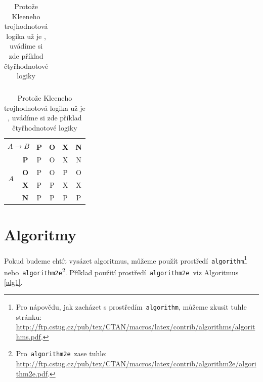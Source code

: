 \documentclass[11pt]{article}
\begin{document}
\begin{table}[h]
\begin{tabular}{|c|>{\bfseries}c|c|c|c|c|}
                    \hline 
                \end{tabular}
                \begin{tabular}{|c|>{\bfseries}c|c|c|c|c|}
                    \hline 
                    \multicolumn{2}{|c|}{\multirow{2}{*}{$A \rightarrow B$}}&\multicolumn{4}{|c|}{$B$}\\\cline{3-6}
                    \multicolumn{2}{|c|}{} & \textbf{P} & \textbf{O} & \textbf{X} & \textbf{N} \\ 
                    \hline 
                    \multirow{4}{*}{$A$}
                    & \textbf{P}  &  P & O & X & N  \\\cline{2-6} 
                    & \textbf{O}  &  P & O & P & O  \\\cline{2-6}
                    & \textbf{X}  &  P & P & X & X  \\\cline{2-6}
                    & \textbf{N}  &  P & P & P & P  \\\cline{2-6}
                    \hline 
                \end{tabular}
                \caption{Protože Kleeneho trojhodnotová logika už je , uvádíme si zde příklad čtyřhodnotové logiky}
                \label{tab2}
            \end{table}
            \shorthandon{-}
    
    \pagebreak
    \section{Algoritmy} \label{sec3}
    Pokud budeme chtít vysázet algoritmus, můžeme použít prostředí \,\texttt{algorithm}\footnote{Pro nápovědu, jak zacházet s prostředím \,\texttt{algorithm}, můžeme zkusit tuhle stránku:\\
    \href{http://ftp.cstug.cz/pub/tex/CTAN/macros/latex/contrib/algorithms/algorithms.pdf}{http://ftp.cstug.cz/pub/tex/CTAN/macros/latex/contrib/algorithms/algorithms.pdf}.} \,nebo \,\texttt{algorithm2e}\footnote{Pro \,\texttt{algorithm2e} \,zase tuhle: \href{http://ftp.cstug.cz/pub/tex/CTAN/macros/latex/contrib/algorithm2e/algorithm2e.pdf}{http://ftp.cstug.cz/pub/tex/CTAN/macros/latex/contrib/algorithm2e/algorithm2e.pdf}.}.
    Příklad použití prostředí \,\texttt{algorithm2e} \,viz Algoritmus \ref{alg1}.
    
\end{document}
